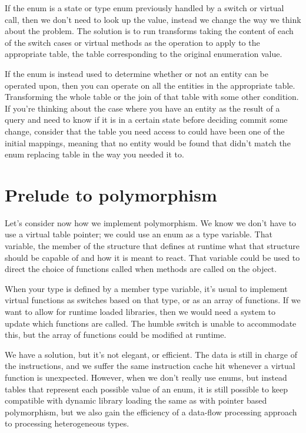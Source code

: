 If the enum is a state or type enum previously handled by a switch or virtual
call, then we don't need to look up the value, instead we change the way we
think about the problem. The solution is to run transforms taking the content
of each of the switch cases or virtual methods as the operation to apply to the
appropriate table, the table corresponding to the original enumeration value.

If the enum is instead used to determine whether or not an entity can be
operated upon, then you can operate on all the entities in the appropriate
table. Transforming the whole table or the join of that table with some other
condition. If you're thinking about the case where you have an entity as the
result of a query and need to know if it is in a certain state before deciding
commit some change, consider that the table you need access to could have been
one of the initial mappings, meaning that no entity would be found that didn't
match the enum replacing table in the way you needed it to.

\section{Prelude to polymorphism}\label{sec:exist-prelpoly}

Let's consider now how we implement polymorphism. We know we don't have to use
a virtual table pointer; we could use an enum as a type variable. That
variable, the member of the structure that defines at runtime what that
structure should be capable of and how it is meant to react. That variable
could be used to direct the choice of functions called when methods are called
on the object.

When your type is defined by a member type variable, it's usual to implement
virtual functions as switches based on that type, or as an array of functions.
If we want to allow for runtime loaded libraries, then we would need a system
to update which functions are called. The humble switch is unable to
accommodate this, but the array of functions could be modified at runtime.

We have a solution, but it's not elegant, or efficient. The data is still in
charge of the instructions, and we suffer the same instruction cache hit
whenever a virtual function is unexpected. However, when we don't really use
enums, but instead tables that represent each possible value of an enum, it is
still possible to keep compatible with dynamic library loading the same as with
pointer based polymorphism, but we also gain the efficiency of a data-flow
processing approach to processing heterogeneous types.


